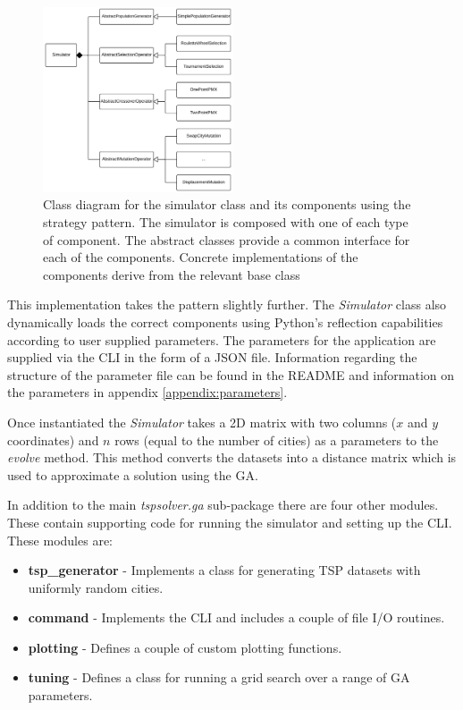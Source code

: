\documentclass[journal]{IEEEtran}
\begin{document}
\begin{figure}[H]
\centering
\includegraphics[width=0.5\textwidth]{img/class_diagram.png}
\caption{Class diagram for the simulator class and its components using the strategy pattern. The simulator is composed with one of each type of component. The abstract classes provide a common interface for each of the components. Concrete implementations of the components derive from the relevant base class}
\label{fig:class-diagram}
\end{figure}


This implementation takes the pattern slightly further. The \textit{Simulator} class also dynamically loads the correct components using Python's reflection capabilities according to user supplied parameters. The parameters for the application are supplied via the CLI in the form of a JSON file. Information regarding the structure of the parameter file can be found in the README and information on the parameters in appendix \ref{appendix:parameters}.

Once instantiated the \textit{Simulator} takes a 2D matrix with two columns ($x$ and $y$ coordinates) and $n$ rows (equal to the number of cities) as a parameters to the \textit{evolve} method. This method converts the datasets into a distance matrix which is used to approximate a solution using the GA.

In addition to the main \textit{tspsolver.ga} sub-package there are four other modules. These contain supporting code for running the simulator and setting up the CLI. These modules are:

\begin{itemize}
	\item \textbf{tsp\_generator} - Implements a class for generating TSP datasets with uniformly random cities.
	\item \textbf{command} - Implements the CLI and includes a couple of file I/O routines.
	\item \textbf{plotting} - Defines a couple of custom plotting functions.
	\item \textbf{tuning} - Defines a class for running a grid search over a range of GA parameters.
\end{itemize}
\end{document}
